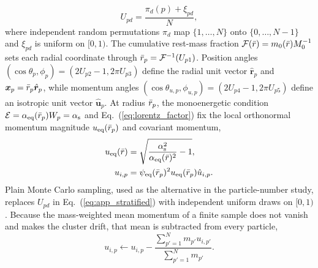\begin{equation}\label{eq:app_stratified}
U_{pd}=\frac{\pi_d(p)+\xi_{pd}}{N},
\end{equation}
where independent random permutations $\pi_d$ map $\{1,\dots,N\}$ onto $\{0,\dots,N-1\}$ and $\xi_{pd}$ is uniform on $[0,1)$. The cumulative rest-mass fraction $\mathcal{F}(\bar{r})=m_0(\bar{r})M_0^{-1}$ sets each radial coordinate through $\bar{r}_p=\mathcal{F}^{-1}(U_{p1})$. Position angles $(\cos\theta_p,\phi_p)=(2U_{p2}-1,2\pi U_{p3})$ define the radial unit vector $\hat{\bm{r}}_p$ and $\bm{x}_p=\bar{r}_p\hat{\bm{r}}_p$, while momentum angles $(\cos\theta_{u,p},\phi_{u,p})=(2U_{p4}-1,2\pi U_{p5})$ define an isotropic unit vector $\hat{\bm{u}}_p$. At radius $\bar{r}_p$, the monoenergetic condition $\mathcal{E}=\alpha_{\mathrm{eq}}(\bar{r}_p)W_p=\alpha_{\mathrm{s}}$ and Eq.~(\ref{eq:lorentz_factor}) fix the local orthonormal momentum magnitude $u_{\mathrm{eq}}(\bar{r}_p)$ and covariant momentum,
\begin{align}\label{eq:app_cluster_momentum}
u_{\mathrm{eq}}(\bar{r})&=\sqrt{\frac{\alpha_{\mathrm{s}}^2}{\alpha_{\mathrm{eq}}(\bar{r})^2}-1},\nonumber\\
u_{i,p}&=\psi_{\mathrm{eq}}(\bar{r}_p)^2u_{\mathrm{eq}}(\bar{r}_p)\hat{u}_{i,p}.
\end{align}
Plain Monte Carlo sampling, used as the alternative in the particle-number study, replaces $U_{pd}$ in Eq.~(\ref{eq:app_stratified}) with independent uniform draws on $[0,1)$. Because the mass-weighted mean momentum of a finite sample does not vanish and makes the cluster drift, that mean is subtracted from every particle,
\begin{equation}\label{eq:app_zero_momentum}
u_{i,p}\leftarrow u_{i,p}-\frac{\sum_{p'=1}^{N}m_{p'}u_{i,p'}}{\sum_{p'=1}^{N}m_{p'}}.
\end{equation}

